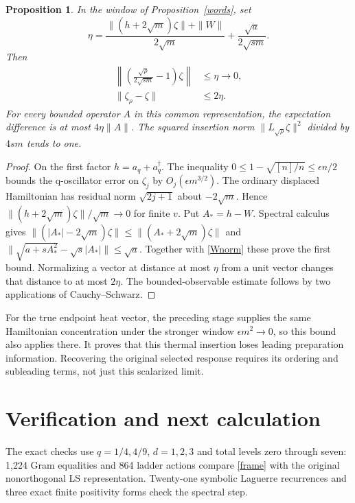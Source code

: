 \documentclass[11pt]{article}
\newtheorem{proposition}{Proposition}
\newcommand{\eps}{\epsilon}
\begin{document}
\begin{proposition}\label{selected}
In the window of Proposition~\ref{words}, set
\[
 \eta=\frac{\|(h+2\sqrt m)\zeta\|+\|W\|}{2\sqrt m}
               +\frac{\sqrt a}{2\sqrt{s m}}.
\]
Then
\begin{align}
 \left\|\left(\frac{\sqrt\rho}{2\sqrt{s m}}-1\right)
                  \zeta\right\|&\le\eta\longrightarrow0,\\
 \|\zeta_\rho-\zeta\|&\le2\eta.\label{selectedbound}
\end{align}
For every bounded operator $A$ in this common representation,
the expectation difference is at most $4\eta\|A\|$.
The squared insertion norm $\|L_{\sqrt\rho}\zeta\|^2$
divided by $4sm$ tends to one.
\end{proposition}
\begin{proof}
On the first factor $h=a_q+a_q^\dagger$.
The inequality $0\le1-\sqrt{[n]/n}\le\eps n/2$ bounds the
q-oscillator error on $\zeta_j$ by
$O_j(\eps m^{3/2})$. The ordinary displaced Hamiltonian
has residual norm $\sqrt{2j+1}$ about $-2\sqrt m$.
Hence $\|(h+2\sqrt m)\zeta\|/\sqrt m\to0$ for finite $v$.
Put $A_*=h-W$. Spectral calculus gives
$\|(|A_*|-2\sqrt m)\zeta\|\le\|(A_*+2\sqrt m)\zeta\|$
and
$\|\sqrt{a+sA_*^2}-\sqrt{s}|A_*|\|\le\sqrt a$.
Together with \eqref{Wnorm} these prove the first bound.
Normalizing a vector at distance at most $\eta$ from a unit
vector changes that distance to at most $2\eta$.
The bounded-observable estimate follows by two applications
of Cauchy--Schwarz.
\end{proof}

For the true endpoint heat vector, the preceding stage supplies
the same Hamiltonian concentration under the stronger window
$\eps m^2\to0$, so this bound also applies there.
It proves that this thermal insertion loses leading preparation
information. Recovering the original selected response requires
its ordering and subleading terms, not just this scalarized limit.

\newpage
\section{Verification and next calculation}
The exact checks use $q=1/4,4/9$, $d=1,2,3$ and total levels
zero through seven: 1,224 Gram equalities and 864 ladder
actions compare \eqref{frame} with the original nonorthogonal
LS representation. Twenty-one symbolic Laguerre recurrences
and three exact finite positivity forms check the spectral step.
\end{document}
